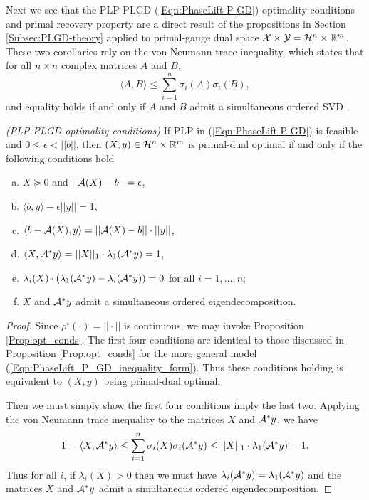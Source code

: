 Next we see that the PLP-PLGD (\ref{Eqn:PhaseLift-P-GD}) optimality conditions and primal recovery property are a direct result of the propositions in Section \ref{Subsec:PLGD-theory} applied to primal-gauge dual space ${\mathcal X} \times {\mathcal Y} = {\mathcal H}^n \times {\mathbb R}^m$.  These two corollaries rely on the von Neumann trace inequality, which states that for all $n \times n$ complex matrices $A$ and $B$,
\begin{equation}			\label{Eqn:von_Neumann_trace_inequality}
\langle A, B \rangle \leq \sum_{i=1}^n \sigma_i(A) \sigma_i(B),
\end{equation}
and equality holds if and only if $A$ and $B$ admit a simultaneous ordered SVD \cite{grigorieff1991note}.

\begin{cor} 		\label{Cor:PLGD-optimality}
\emph{(PLP-PLGD optimality conditions)}
If PLP in (\ref{Eqn:PhaseLift-P-GD}) is feasible and $0 \leq \epsilon < ||b||$, then $(X, y) \in {\mathcal H}^n \times {\mathbb R}^m$ is primal-dual optimal if and only if the following conditions hold
\begin{enumerate}[(a)]
\item
$X \succeq 0$ and $||{\mathcal A}(X) -b||=\epsilon$,

\item
$\langle b, y \rangle - \epsilon ||y|| = 1$,

\item
$\langle b - {\mathcal A}(X), y \rangle = ||{\mathcal A}(X)-b|| \cdot ||y||$,

\item
$\langle X, {\mathcal A}^*y \rangle = ||X||_1 \cdot \lambda_1({\mathcal A}^*y) = 1$,

\item
$\lambda_i(X) \cdot \left( \lambda_1({\mathcal A}^* y) - \lambda_i ({\mathcal A}^* y)  \right) = 0$ for all $i = 1, \ldots, n$;

\item
$X$ and ${\mathcal A}^*y$ admit a simultaneous ordered eigendecomposition.
\end{enumerate}
\end{cor}
\begin{proof}
Since $\rho^\circ(\cdot) = ||\cdot||$ is continuous, we may invoke Proposition \ref{Prop:opt_conds}. The first four conditions are identical to those discussed in Proposition \ref{Prop:opt_conds} for the more general model (\ref{Eqn:PhaseLift_P_GD_inequality_form}).  Thus these conditions holding is equivalent to $(X,y)$ being primal-dual optimal.

Then we must simply show the first four conditions imply the last two.    Applying the von Neumann trace inequality to the matrices $X$ and ${\mathcal A}^*y$, we have
\[
1 = \langle X, {\mathcal A}^*y \rangle \leq \sum_{i=1}^n \sigma_i(X) \sigma_i({\mathcal A}^*y) \leq ||X||_1 \cdot \lambda_1({\mathcal A}^*y) = 1.
\]
Thus for all $i$, if $\lambda_i(X) > 0$ then we must have $\lambda_i({\mathcal A}^*y) = \lambda_1({\mathcal A}^*y)$ and the matrices $X$ and ${\mathcal A}^*y$ admit a simultaneous ordered eigendecomposition.
\end{proof}





